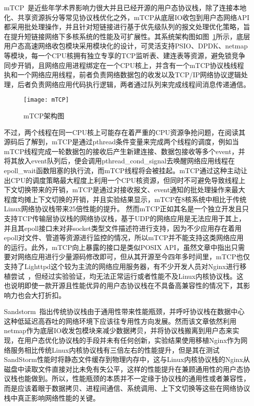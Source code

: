 mTCP~\cite{mTCP}是近些年学术界影响力很大并且已经开源的用户态协议栈，除了连接本地化、共享资源拆分等常见协议栈优化之外，mTCP从底层IO收包到用户态网络API都采用批处理操作，并且针对短链接进行基于优先级队列的报文处理优化策略，旨在提升短链接网络下多核系统的性能及可扩展性。其系统架构图如图~\ref{fig:mTCP}所示，底层用户态高速网络收包模块采用模块化的设计，可灵活支持PSIO、DPDK、netmap等模块，每一个CPU核拥有独立专享的TCP监听表、建连表等资源，避免锁竞争同步开销，且网络应用进程绑定在一个CPU核上，并含有一个mTCP协议栈线程执和一个网络应用线程，前者负责网络数据包的收发以及TCP/IP网络协议逻辑处理，后者负责网络应用代码执行逻辑，两者通过队列来完成线程间消息传递通信。
\vspace{-10pt}
\begin{figure}[H] %
  \centering
  \texttt{[image: mTCP]}
  \caption{mTCP架构图}
  \label{fig:mTCP}
\end{figure}
\vspace{-10pt}
不过，两个线程在同一CPU核上可能存在着严重的CPU资源争抢问题，在阅读其源码后了解到，mTCP是通过pthread条件变量来完成两个线程的调度，例如当mTCP线程完成一轮数据包的接收后产生新建连接、数据包接收等多个event，并将其放入event队列后，便会调用pthread\_cond\_signal去唤醒网络应用线程在epoll\_wait函数阻塞的执行流，而mTCP线程将会被挂起。mTCP通过这种主动让出CPU的调度策略最大程度上利用一个CPU核资源，但同时不可避免导致线程上下文切换带来的开销，mTCP是通过对接收报文、event通知的批处理操作来最大程度均摊上下文切换的开销，并且实验结果显示，mTCP在8核系统中相比于传统Linux网络协议栈带来25倍性能的提升。
然而mTCP正如其名是一个独立开发且只支持TCP传输层协议栈的网络协议栈，基于UDP的网络应用是无法应用于其上，并且其epoll接口未对非socket类型文件描述符进行支持，因为不少应用存在着用epoll对文件、管道等资源进行监控的情况，所以mTCP并不能支持这类网络应用的运行。此外，mTCP向上暴露的接口是类似POSIX API，虽然文章中指出只需要对网络应用进行少量源码修改即可，但从其开源至今四年多时间里，mTCP也仅支持了Lighttpd这个较为主流的网络应用服务器，有不少开发人员对Nginx进行移植尝试~\cite{nginxmtcp1,nginxmtcp2}，但经过实验验证，均无法正常运行或者性能不及Linux内核协议栈。这也说明即使一款开源且性能优异的用户态协议栈在不具备高兼容性的情况下，其影响力也会大打折扣。

Sandstorm~\cite{Sandstorm}指出传统协议栈由于通用性带来性能瓶颈，并呼吁协议栈在数据中心这种低延迟高吞吐的网络环境下应该往专用性方向发展。然而该文章依然利用netmap作为底层IO收发包模块来减少数据拷贝，并将协议栈搬离到用户态来实现，在用户态优化协议栈的手段并未有任何创新，实验结果使用移植Nginx作为网络服务相比传统Linux内核协议栈有三倍左右的性能提升，但是其在测试SandStorm性能时将静态文件缓存到物理内存中，这与Linux内核协议栈的Nginx从磁盘中读取文件直接对比未免有失公平，这样的性能提升在兼顾通用性的用户态协议栈也能做到。所以，性能瓶颈的本质并不一定缘于协议栈的通用性或者兼容性，而是应该着眼于数据拷贝、进程间通信、系统调用、上下文切换等这些在网络协议栈中真正影响网络性能的关键。


